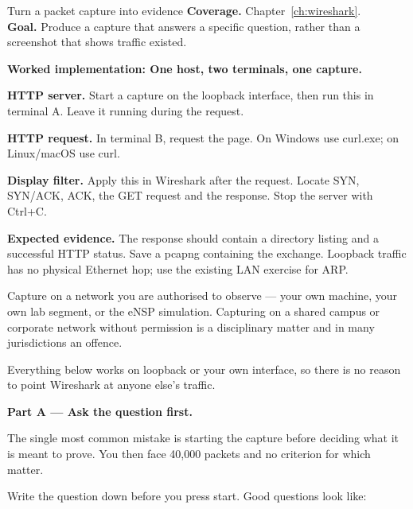 
\begin{labproject}{Turn a packet capture into evidence}
\textbf{Coverage.} Chapter~\ref{ch:wireshark}.\\
\textbf{Goal.} Produce a capture that answers a specific question, rather than a screenshot that shows traffic existed.



\noindent\textbf{Worked implementation: One host, two terminals, one capture.}

\noindent\textbf{HTTP server.} Start a capture on the loopback interface, then run this in terminal A. Leave it running during the request.


\noindent\textbf{HTTP request.} In terminal B, request the page. On Windows use curl.exe; on Linux/macOS use curl.


\noindent\textbf{Display filter.} Apply this in Wireshark after the request. Locate SYN, SYN/ACK, ACK, the GET request and the response. Stop the server with Ctrl+C.


\textbf{Expected evidence.} The response should contain a directory listing and a successful HTTP status. Save a pcapng containing the exchange. Loopback traffic has no physical Ethernet hop; use the existing LAN exercise for ARP.




\begin{labmode}
Capture on a network you are authorised to observe --- your own machine, your own lab segment, or the eNSP simulation. Capturing on a shared campus or corporate network without permission is a disciplinary matter and in many jurisdictions an offence.

Everything below works on loopback or your own interface, so there is no reason to point Wireshark at anyone else's traffic.
\end{labmode}

\medskip\noindent\textbf{Part A --- Ask the question first.}\par
The single most common mistake is starting the capture before deciding what it is meant to prove. You then face 40{,}000 packets and no criterion for which matter.

Write the question down before you press start. Good questions look like:


\end{labproject}
